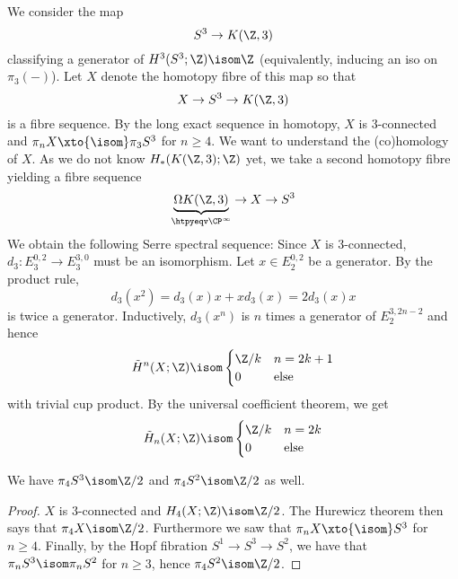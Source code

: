 \begin{example}
	We consider the map
	\begin{equation*}
		S^3 \to K(\Z, 3)
	\end{equation*}
	classifying a generator of $H^3(S^3; \Z) \isom \Z$ (equivalently, inducing an iso on $\pi_3({{-}})$).
	Let $X$ denote the homotopy fibre of this map so that 
	\begin{equation*}
		X \to S^3 \to K(\Z, 3)
	\end{equation*}
	is a fibre sequence.
	By the long exact sequence in homotopy, $X$ is 3-connected and $\pi_n X \xto{\isom} \pi_3 S^3$ for $n \geq 4$. 
	We want to understand the (co)homology of $X$.
	As we do not know $H_*(K(\Z, 3); \Z)$ yet, we take a second homotopy fibre yielding a fibre sequence
	\begin{equation*}
		\underbrace{\Omega K(\Z, 3)}_{\htpyeqv \CP^\infty} \to X \to S^3
	\end{equation*}
	We obtain the following Serre spectral sequence:
	Since $X$ is 3-connected, $d_3\colon E_3^{0, 2} \to E_3^{3, 0}$ must be an isomorphism.
	Let $x \in E_2^{0, 2}$ be a generator.
	By the product rule,
	\begin{equation*}
		d_3(x^2) = d_3(x) x + x d_3(x) = 2 d_3(x)x
	\end{equation*}
	is twice a generator.
	Inductively, $d_3(x^n)$ is $n$ times a generator of $E_2^{3, 2n - 2}$ and hence
	\begin{equation*}
		\tilde{H}^n(X; \Z) \isom \begin{cases}
			\Zn{k}  & n = 2k + 1 \\
			0 		& \text{else}
		\end{cases}
	\end{equation*}
	with trivial cup product.
	By the universal coefficient theorem, we get
	\begin{equation*}
		\tilde{H}_n(X; \Z) \isom \begin{cases}
			\Zn{k} 	& n = 2k \\
			0 	  	& \text{else}
		\end{cases}
	\end{equation*}
\end{example}
\begin{corollary}
	We have $\pi_4 S^3 \isom \Zn{2}$ and $\pi_4 S^2 \isom \Zn{2}$ as well.
\end{corollary}
\begin{proof}
	$X$ is 3-connected and $H_4(X; \Z) \isom \Zn{2}$.
	The Hurewicz theorem then says that $\pi_4 X \isom \Zn{2}$.
	Furthermore we saw that $\pi_n X \xto{\isom} S^3$ for $n \geq 4$.
	Finally, by the Hopf fibration $S^1 \to S^3 \to S^2$, we have that $\pi_n S^3 \isom \pi_n S^2$ for $n \geq 3$, hence $\pi_4 S^2 \isom \Zn{2}$.
\end{proof}

